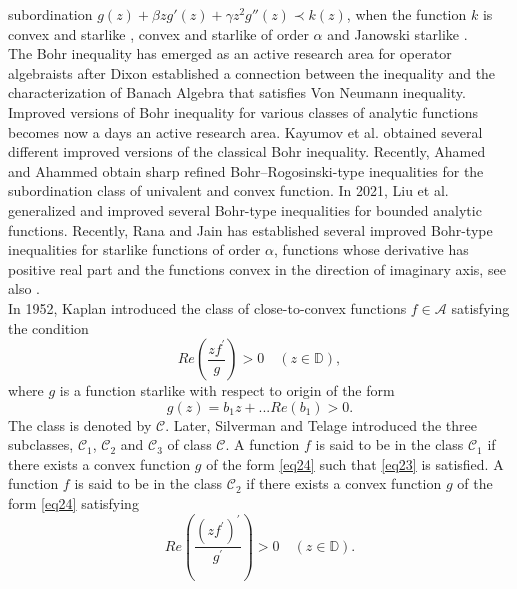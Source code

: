 \documentclass[12pt,a4paper,reqno]{amsart}
\theoremstyle{definition}
\theoremstyle{plain}
\numberwithin{equation}{section}
\begin{document}
subordination $g(z)+\beta zg'(z)+\gamma z^2g''(z)\prec k(z)$, when the function $k$ is convex and starlike \cite{Abu2014}, convex and starlike of order $\alpha$ \cite{Jai2020} and  Janowski starlike \cite{Ana2021}.
\\
\noindent
The Bohr inequality has emerged as an active research area for operator algebraists after Dixon \cite{Dix1995} established a connection between the inequality and the characterization of Banach Algebra that satisfies Von Neumann inequality. Improved versions of Bohr inequality for various classes of analytic functions  becomes now a days an active research area. Kayumov et al. \cite{Kay2018} obtained several different improved versions of the classical Bohr inequality. Recently, Ahamed and  Ahammed \cite{ahm2023} obtain sharp refined Bohr–Rogosinski-type
inequalities for the subordination class of univalent and convex function. In 2021, Liu et al. \cite{LIU2021} generalized and improved several Bohr-type inequalities for bounded analytic functions. Recently, Rana and Jain  \cite{sha2025} has established several improved Bohr-type inequalities for starlike functions of order $\alpha$,  functions whose derivative has positive real part and the  functions  convex in the direction of imaginary axis, see also \cite{Pon2020, Hua2020, Liu2023, Pon2023}.
\\
\noindent
In 1952, Kaplan \cite{Kap1952} introduced the class of close-to-convex functions $f\in\mathcal{A}$ satisfying the condition
\begin{equation}\label{eq23}
Re \left(\frac{zf^{'}}{g} \right) >0\quad (z \in \mathbb{D}),
\end{equation}
where $g$ is a function starlike  with respect to origin  of the form
\begin{equation}\label{eq24}
g(z)=b_1z+...  Re(b_1)> 0.
\end{equation}
The class is denoted by $\mathcal{C}$. Later, Silverman and Telage \cite{sil1979} introduced the three subclasses, $\mathcal{C}_1$, $\mathcal{C}_2$ and $\mathcal{C}_3$ of class $\mathcal{C}$.
\noindent
A function $f$ is said to be in the class $\mathcal{C}_1$ if there exists a convex function $g$ of the form \eqref{eq24} such that \eqref{eq23} is satisfied.
A function $f$ is said to be in the class $\mathcal{C}_2$ if there exists a convex function $g$ of the form \eqref{eq24} satisfying
\begin{equation*}
Re\left( \frac{(zf^{'})^{'}}{g^{'}}  \right)>0\quad (z \in \mathbb{D}).
\end{equation*}
\noindent
\end{document}
